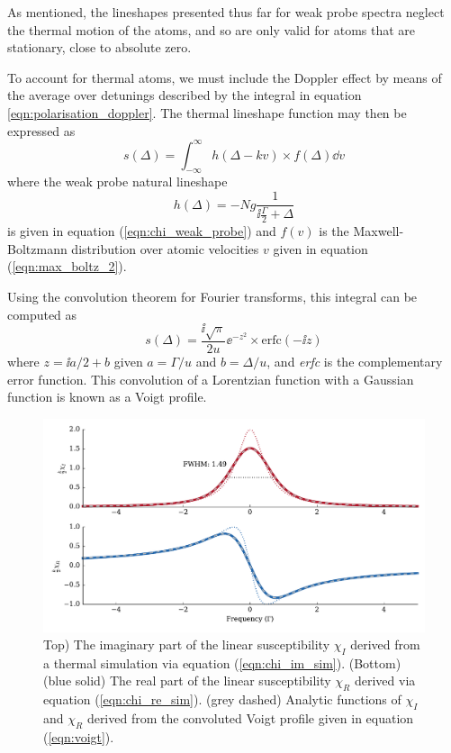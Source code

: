     As mentioned, the lineshapes presented thus far for weak probe spectra
    neglect the thermal motion of the atoms, and so are only valid for atoms
    that are stationary, \ie close to absolute zero. 

    To account for thermal atoms, we must include the Doppler effect by means of
    the average over detunings described by the integral in equation
    \ref{eqn:polarisation_doppler}. The thermal lineshape function may then be expressed as
    \begin{equation}
      s(\Delta) = \int_{-\infty}^\infty h(\Delta - k v) \times f(\Delta) \dd v
    \end{equation}
    where the weak probe natural lineshape
    \begin{equation}
      h(\Delta) = -Ng \frac{1}{\ii \frac{\Gamma}{2} + \Delta}
    \end{equation}
    is given in equation (\ref{eqn:chi_weak_probe}) and $f(v)$ is the Maxwell-
    Boltzmann distribution over atomic velocities $v$ given in equation
    (\ref{eqn:max_boltz_2}).

    Using the convolution theorem for Fourier transforms, this integral can be computed as
    \begin{equation}
      s(\Delta) = \frac{\ii\sqrt{\pi}}{2u} \ee^{-z^2} \times \mathrm{erfc}(-\ii z)
      \label{eqn:voigt}
    \end{equation}
    where $z = \ii a/2  + b$ given $a = \Gamma/u$ and $b = \Delta/u$, and
    \textit{erfc} is the complementary error function.\cite{Siddons2008} This
    convolution of a Lorentzian function with a Gaussian function is known as a
    Voigt profile.

    \begin{figure}[]
      \includegraphics[width=\linewidth]{figs/02_propagation/mb_two_solve_wpdopp_t01_Ng0010_vel05_D10_2_fig3.pdf}
      \caption{
      Top) The imaginary part of the linear susceptibility $\chi_I$ derived from
      a thermal simulation via equation (\ref{eqn:chi_im_sim}). (Bottom) (blue
      solid) The real part of the linear susceptibility $\chi_R$ derived via
      equation (\ref{eqn:chi_re_sim}). (grey dashed) Analytic functions of
      $\chi_I$ and $\chi_R$ derived from the convoluted Voigt profile given in
      equation (\ref{eqn:voigt}).
      } 
      \label{fig:linear_scan_dopp}
    \end{figure}

